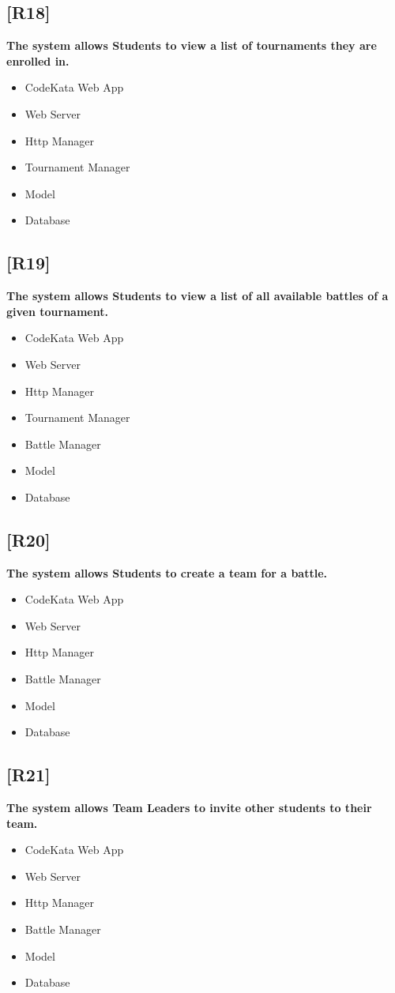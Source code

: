 \documentclass{article}
\begin{document}
\subsection{[R18]}
\textbf{ The system allows Students to view a list of tournaments they are enrolled in.}
\begin{itemize}
\item CodeKata Web App
\item Web Server
\item Http Manager
\item Tournament Manager
\item Model
\item Database
\end{itemize}
\subsection{[R19]}
\textbf{ The system allows Students to view a list of all available battles of a given tournament.}
\begin{itemize}
\item CodeKata Web App
\item Web Server
\item Http Manager
\item Tournament Manager
\item Battle Manager
\item Model
\item Database
\end{itemize}
\subsection{[R20]}
\textbf{ The system allows Students to create a team for a battle.}
\begin{itemize}
\item CodeKata Web App
\item Web Server
\item Http Manager
\item Battle Manager
\item Model
\item Database
\end{itemize}
\subsection{[R21]}
\textbf{ The system allows Team Leaders to invite other students to their team.}
\begin{itemize}
\item CodeKata Web App
\item Web Server
\item Http Manager
\item Battle Manager
\item Model
\item Database
\end{itemize}
\end{document}
